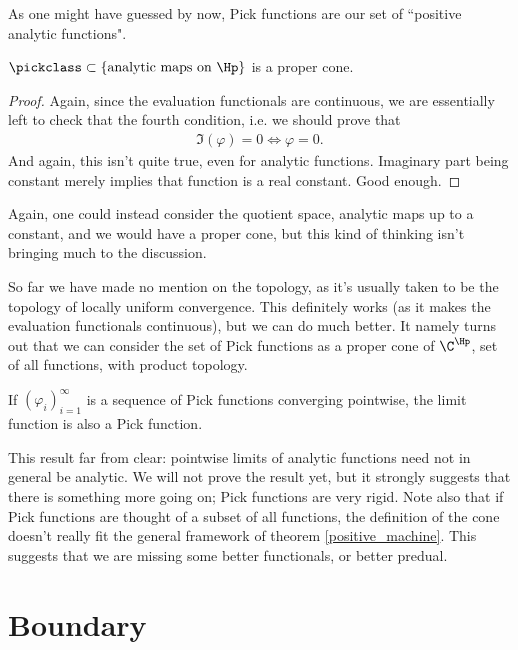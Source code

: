 As one might have guessed by now, Pick functions are our set of ``positive analytic functions".

\begin{lause}
	$\pickclass \subset \{\text{analytic maps on $\Hp$} \}$ is a proper cone.
\end{lause}
\begin{proof}
	Again, since the evaluation functionals are continuous, we are essentially left to check that the fourth condition, i.e. we should prove that
	\begin{align*}
		\Im(\varphi) = 0 \Leftrightarrow \varphi = 0.
	\end{align*}
	And again, this isn't quite true, even for analytic functions. Imaginary part being constant merely implies that function is a real constant. Good enough.
\end{proof}

Again, one could instead consider the quotient space, analytic maps up to a constant, and we would have a proper cone, but this kind of thinking isn't bringing much to the discussion.

So far we have made no mention on the topology, as it's usually taken to be the topology of locally uniform convergence. This definitely works (as it makes the evaluation functionals continuous), but we can do much better. It namely turns out that we can consider the set of Pick functions as a proper cone of $\C^{\Hp}$, set of all functions, with product topology.

\begin{prop}\label{pick_convergence}
	If $(\varphi_{i})_{i = 1}^{\infty}$ is a sequence of Pick functions converging pointwise, the limit function is also a Pick function.
\end{prop}

This result far from clear: pointwise limits of analytic functions need not in general be analytic. We will not prove the result yet, but it strongly suggests that there is something more going on; Pick functions are very rigid. Note also that if Pick functions are thought of a subset of all functions, the definition of the cone doesn't really fit the general framework of theorem \ref{positive_machine}. This suggests that we are missing some better functionals, or better predual.

\section{Boundary}

